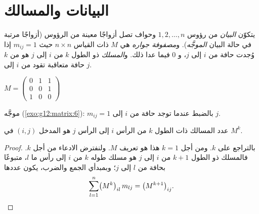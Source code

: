 \section{البيانات والمسالك}

\begin{definition}\label{def:g12:matrix:graph}
يتكوّن \emph{البيان} من رؤوس $1, 2, \dots, n$ وحواف
تصل أزواجًا معينة من الرؤوس (أزواجًا مرتبة في حالة البيان
\emph{الموجَّه}). و\emph{مصفوفة جواره} هي
 $M$ ذات القياس $n \times n$ حيث $m_{ij} = 1$ إذا وُجدت حافة من $i$ إلى
$j$، و $0$ فيما عدا ذلك. و\emph{المسلك} ذو الطول $k$ من $i$ إلى $j$ هو
 من $k$ حافة متعاقبة تقود من $i$ إلى $j$.
\end{definition}

\begin{omfigure}
\qquad\qquad
$M = \begin{pmatrix} 0 & 1 & 1\\ 0 & 0 & 1\\ 1 & 0 & 0 \end{pmatrix}$

{\small {} موجَّه 
(\cref{exo:g12:matrix:6}): $m_{ij} = 1$ بالضبط عندما توجد حافة
من $i$ إلى $j$.}
\end{omfigure}

\begin{theorem}[عدّ المسالك]\label{thm:g12:matrix:walks}
عدد المسالك ذات الطول $k$ من الرأس $i$ إلى الرأس $j$ هو
المدخل $(i,j)$ في $M^k$.
\end{theorem}

\begin{proof}
بالتراجع على $k$. ومن أجل $k = 1$ هذا هو تعريف $M$. ولنفترض
الادعاء من أجل $k$. فالمسلك ذو الطول $k+1$ من $i$ إلى $j$ هو مسلك طوله
$k$ من $i$ إلى رأس ما $l$، متبوعًا بحافة من $l$ إلى $j$؛ وبمبدأي
الجمع والضرب، يكون عددها
\[
\sum_{l=1}^{n} \bigl(M^k\bigr)_{il}\, m_{lj} = \bigl(M^{k+1}\bigr)_{ij}.
\qedhere
\]
\end{proof}

